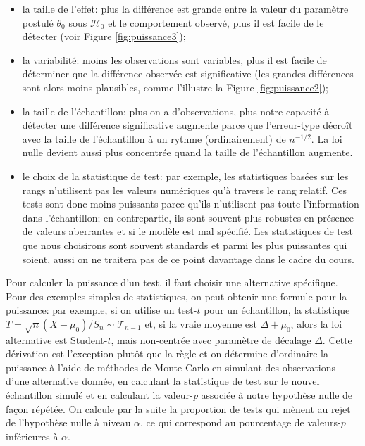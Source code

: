 \documentclass[
  11pt,
  letterpaper,
]{book}
\providecommand{\tightlist}{%
  \setlength{\itemsep}{0pt}\setlength{\parskip}{0pt}}
\theoremstyle{definition}
\theoremstyle{definition}
\theoremstyle{definition}
\theoremstyle{remark}
\begin{document}
\begin{itemize}
\tightlist
\item
  la taille de l'effet: plus la différence est grande entre la valeur du paramètre postulé \(\theta_0\) sous \(\mathscr{H}_0\) et le comportement observé, plus il est facile de le détecter (voir Figure \ref{fig:puissance3});
\item
  la variabilité: moins les observations sont variables, plus il est facile de déterminer que la différence observée est significative (les grandes différences sont alors moins plausibles, comme l'illustre la Figure \ref{fig:puissance2});
\item
  la taille de l'échantillon: plus on a d'observations, plus notre capacité à détecter une différence significative augmente parce que l'erreur-type décroît avec la taille de l'échantillon à un rythme (ordinairement) de \(n^{-1/2}\). La loi nulle devient aussi plus concentrée quand la taille de l'échantillon augmente.
\item
  le choix de la statistique de test: par exemple, les statistiques basées sur les rangs n'utilisent pas les valeurs numériques qu'à travers le rang relatif. Ces tests sont donc moins puissants parce qu'ils n'utilisent pas toute l'information dans l'échantillon; en contrepartie, ils sont souvent plus robustes en présence de valeurs aberrantes et si le modèle est mal spécifié. Les statistiques de test que nous choisirons sont souvent standards et parmi les plus puissantes qui soient, aussi on ne traitera pas de ce point davantage dans le cadre du cours.
\end{itemize}

Pour calculer la puissance d'un test, il faut choisir une alternative spécifique. Pour des exemples simples de statistiques, on peut obtenir une formule pour la puissance: par exemple, si on utilise un test-\(t\) pour un échantillon, la statistique \(T=\sqrt{n}(\overline{X}-\mu_0)/S_n \sim \mathcal{T}_{n-1}\) et, si la vraie moyenne est \(\Delta + \mu_0\), alors la loi alternative est Student-\(t\), mais non-centrée avec paramètre de décalage \(\Delta\). Cette dérivation est l'exception plutôt que la règle et on détermine d'ordinaire la puissance à l'aide de méthodes de Monte Carlo en simulant des observations d'une alternative donnée, en calculant la statistique de test sur le nouvel échantillon simulé et en calculant la valeur-\emph{p} associée à notre hypothèse nulle de façon répétée. On calcule par la suite la proportion de tests qui mènent au rejet de l'hypothèse nulle à niveau \(\alpha\), ce qui correspond au pourcentage de valeurs-\(p\) inférieures à \(\alpha\).
\end{document}
